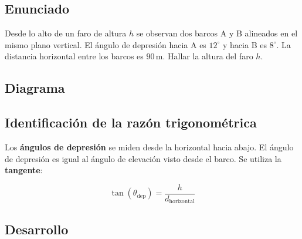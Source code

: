 \documentclass[11pt, letterpaper]{article}
\begin{document}
\subsection*{Enunciado}
Desde lo alto de un faro de altura \(h\) se observan dos barcos A y B alineados
en el mismo plano vertical. El ángulo de depresión hacia A es \(12^\circ\) y
hacia B es \(8^\circ\). La distancia horizontal entre los barcos es \(90\,\text{m}\).
Hallar la altura del faro \(h\).

\subsection*{Diagrama}

\begin{center}
\end{center}

\subsection*{Identificación de la razón trigonométrica}

Los \textbf{ángulos de depresión} se miden desde la horizontal hacia abajo.
El ángulo de depresión es igual al ángulo de elevación visto desde el barco.
Se utiliza la \textbf{tangente}:

\begin{formulabox}
\[
  \tan(\theta_{\text{dep}}) = \frac{h}{d_{\text{horizontal}}}
\]
\end{formulabox}

\subsection*{Desarrollo}
\end{document}
